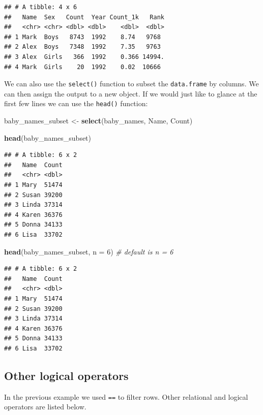 \documentclass[]{book}
\newenvironment{Shaded}{\begin{snugshade}}{\end{snugshade}}
\newcommand{\CommentTok}[1]{\textcolor[rgb]{0.56,0.35,0.01}{\textit{#1}}}
\newcommand{\DataTypeTok}[1]{\textcolor[rgb]{0.13,0.29,0.53}{#1}}
\newcommand{\DecValTok}[1]{\textcolor[rgb]{0.00,0.00,0.81}{#1}}
\newcommand{\KeywordTok}[1]{\textcolor[rgb]{0.13,0.29,0.53}{\textbf{#1}}}
\newcommand{\NormalTok}[1]{#1}
\newcommand{\StringTok}[1]{\textcolor[rgb]{0.31,0.60,0.02}{#1}}
\begin{document}
\begin{verbatim}
## # A tibble: 4 x 6
##   Name  Sex   Count  Year Count_1k   Rank
##   <chr> <chr> <dbl> <dbl>    <dbl>  <dbl>
## 1 Mark  Boys   8743  1992    8.74   9768 
## 2 Alex  Boys   7348  1992    7.35   9763 
## 3 Alex  Girls   366  1992    0.366 14994.
## 4 Mark  Girls    20  1992    0.02  10666
\end{verbatim}

We can also use the \texttt{select()} function to subset the \texttt{data.frame}
by columns. We can then assign the output to a new object. If we
would just like to glance at the first few lines we can use the
\texttt{head()} function:

\begin{Shaded}
\begin{Highlighting}[]
\NormalTok{baby_names_subset <-}\StringTok{ }\KeywordTok{select}\NormalTok{(baby_names, Name, Count)}

\KeywordTok{head}\NormalTok{(baby_names_subset)}
\end{Highlighting}
\end{Shaded}

\begin{verbatim}
## # A tibble: 6 x 2
##   Name  Count
##   <chr> <dbl>
## 1 Mary  51474
## 2 Susan 39200
## 3 Linda 37314
## 4 Karen 36376
## 5 Donna 34133
## 6 Lisa  33702
\end{verbatim}

\begin{Shaded}
\begin{Highlighting}[]
\KeywordTok{head}\NormalTok{(baby_names_subset, }\DataTypeTok{n =} \DecValTok{6}\NormalTok{) }\CommentTok{# default is n = 6}
\end{Highlighting}
\end{Shaded}

\begin{verbatim}
## # A tibble: 6 x 2
##   Name  Count
##   <chr> <dbl>
## 1 Mary  51474
## 2 Susan 39200
## 3 Linda 37314
## 4 Karen 36376
## 5 Donna 34133
## 6 Lisa  33702
\end{verbatim}

\hypertarget{other-logical-operators}{%
\subsection{Other logical operators}\label{other-logical-operators}}

In the previous example we used \texttt{==} to filter rows. Other relational
and logical operators are listed below.
\end{document}
